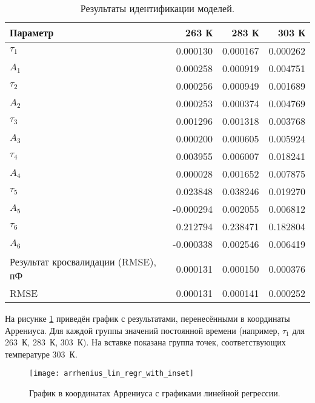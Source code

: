 	\begin{table}[!htp]
		\centering
		\caption{Результаты идентификации моделей.}
		\begin{tabular}{|l|r|r|r|}
			\hline
			Параметр                           &  263 К    & 283 К    & 303 К    \\ \hline
			$\tau_1$                           &  0.000130 & 0.000167 & 0.000262 \\ \hline
			$A_1$                              &  0.000258 & 0.000919 & 0.004751 \\ \hline
			$\tau_2$                           &  0.000256 & 0.000949 & 0.001689 \\ \hline
			$A_2$                              &  0.000253 & 0.000374 & 0.004769 \\ \hline
			$\tau_3$                           &  0.001296 & 0.001318 & 0.003768 \\ \hline
			$A_3$                              &  0.000200 & 0.000605 & 0.005924 \\ \hline
			$\tau_4$                           &  0.003955 & 0.006007 & 0.018241 \\ \hline
			$A_4$                              &  0.000028 & 0.001652 & 0.007875 \\ \hline
			$\tau_5$                           &  0.023848 & 0.038246 & 0.019270 \\ \hline
			$A_5$                              & -0.000294 & 0.002055 & 0.006812 \\ \hline
			$\tau_6$                           &  0.212794 & 0.238471 & 0.182804 \\ \hline
			$A_6$                              & -0.000338 & 0.002546 & 0.006419 \\ \hline
			Результат кросвалидации (RMSE), пФ &  0.000131 & 0.000150 & 0.000376 \\ \hline
			RMSE                               &  0.000131 & 0.000141 & 0.000252 \\ \hline
		\end{tabular}
		\label{table:6_exp_results}
	\end{table}


	На рисунке \ref{pic:arrhenius_lin_regr_with_inset} приведён график с
	результатами, перенесёнными в координаты Аррениуса. Для каждой группы
	значений постоянной времени (например, $\tau_1$ для 263~К, 283~К, 303~К).
	На вставке показана группа точек, соответствующих температуре 303~К.

	\begin{figure}[!htp]
		\centering
		\texttt{[image: arrhenius\_lin\_regr\_with\_inset]}
		\caption{График в координатах Аррениуса с графиками линейной регрессии.}
		\label{pic:arrhenius_lin_regr_with_inset}
	\end{figure}


